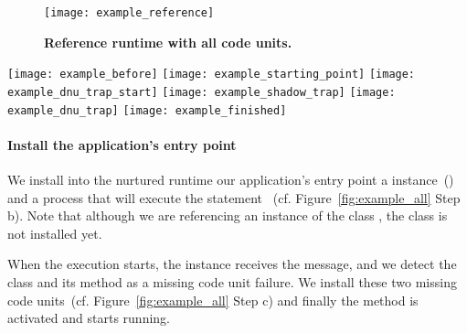 \begin{figure}[ht]
\begin{center}
\texttt{[image: example\_reference]}
\caption{\textbf{Reference runtime with all code units.}\label{fig:example_reference}}
\end{center}
\end{figure}


\begin{figure*}[ht]
\begin{center}
\texttt{[image: example\_before]}
\texttt{[image: example\_starting\_point]}
\texttt{[image: example\_dnu\_trap\_start]}
\texttt{[image: example\_shadow\_trap]}
\texttt{[image: example\_dnu\_trap]}
\texttt{[image: example\_finished]}
\caption{\textbf{The nurtured runtime at different steps of tailoring.} \label{fig:example_all}}
\end{center}
\end{figure*}

\paragraph{Install the application's entry point} We install into the nurtured runtime our application's entry point \ie a  instance~() and a process that will execute the statement ~(cf. Figure~\ref{fig:example_all} Step b). Note that although we are referencing an instance of the class , the  class is not installed yet.


When the execution starts, the  instance receives the  message, and we detect the  class and its  method as a missing code unit failure. We install these two missing code units~(cf. Figure~\ref{fig:example_all} Step c) and finally the  method is activated and starts running.

